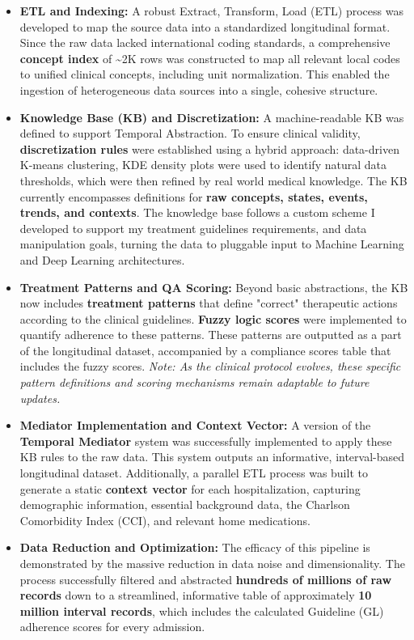 \documentclass[
]{article}
\begin{document}
\begin{itemize}
\item
  \textbf{ETL and Indexing:} A robust Extract, Transform, Load (ETL)
  process was developed to map the source data into a standardized
  longitudinal format. Since the raw data lacked international coding
  standards, a comprehensive \textbf{concept index} of \textasciitilde2K
  rows was constructed to map all relevant local codes to unified
  clinical concepts, including unit normalization. This enabled the
  ingestion of heterogeneous data sources into a single, cohesive
  structure.
\item
  \textbf{Knowledge Base (KB) and Discretization:} A machine-readable KB
  was defined to support Temporal Abstraction. To ensure clinical
  validity, \textbf{discretization rules} were established using a
  hybrid approach: data-driven K-means clustering, KDE density plots
  were used to identify natural data thresholds, which were then refined
  by real world medical knowledge. The KB currently encompasses
  definitions for \textbf{raw concepts, states, events, trends, and
  contexts}. The knowledge base follows a custom scheme I developed to
  support my treatment guidelines requirements, and data manipulation
  goals, turning the data to pluggable input to Machine Learning and
  Deep Learning architectures.
\item
  \textbf{Treatment Patterns and QA Scoring:} Beyond basic abstractions,
  the KB now includes \textbf{treatment patterns} that define "correct"
  therapeutic actions according to the clinical guidelines.
  \textbf{Fuzzy logic scores} were implemented to quantify adherence to
  these patterns. These patterns are outputted as a part of the
  longitudinal dataset, accompanied by a compliance scores table that
  includes the fuzzy scores. \emph{Note: As the clinical protocol
  evolves, these specific pattern definitions and scoring mechanisms
  remain adaptable to future updates.}
\item
  \textbf{Mediator Implementation and Context Vector:} A version of the
  \textbf{Temporal Mediator} system was successfully implemented to
  apply these KB rules to the raw data. This system outputs an
  informative, interval-based longitudinal dataset. Additionally, a
  parallel ETL process was built to generate a static \textbf{context
  vector} for each hospitalization, capturing demographic information,
  essential background data, the Charlson Comorbidity Index (CCI), and
  relevant home medications.
\item
  \textbf{Data Reduction and Optimization:} The efficacy of this
  pipeline is demonstrated by the massive reduction in data noise and
  dimensionality. The process successfully filtered and abstracted
  \textbf{hundreds of millions of raw records} down to a streamlined,
  informative table of approximately \textbf{10 million interval
  records}, which includes the calculated Guideline (GL) adherence
  scores for every admission.
\end{itemize}
\end{document}
